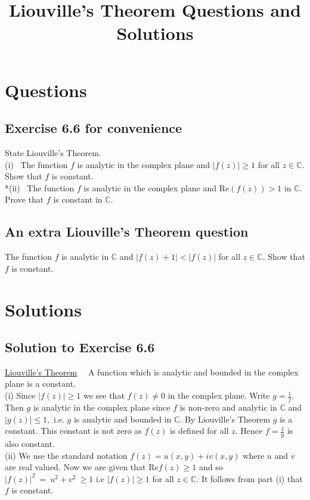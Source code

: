 \documentclass{amsart}
\title{Liouville's Theorem Questions and Solutions}
\begin{document}
\maketitle
\section*{Questions}
\subsection*{Exercise 6.6 for convenience}
 State Liouville's Theorem. \medskip \\
 \indent (i) ~The function $f$ is analytic in the complex plane and $|f(z)| \geq 1$ for all $z \in \mathbb{C}$. Show that $f$ is constant.  \\
 \indent **(ii) ~The function $f$ is analytic in the complex plane and  \textrm{Re}$(f(z)) >1 $ in $\mathbb{C}$. Prove that $f$ is constant in $\mathbb{C}$.

\subsection*{An extra Liouville's Theorem question}
 The function $f$ is analytic in $ \mathbb{C} $ and $ |f(z) +1| < |f(z)|$ for all $ z \in \mathbb{C}$. Show that $f$ is constant. 

\section*{Solutions}
\subsection*{Solution to Exercise 6.6}
\underline{Liouville's Theorem}~~ A function which is analytic and bounded in the complex plane is a constant. \medskip \\
\indent (i) Since $|f(z)| \geq 1$ we see that $f(z) \neq 0$ in the complex plane. Write $g =\frac{1}{f}$. Then $g$ is analytic in the complex plane
since $f$ is non-zero and analytic in $\mathbb{C}$ and $|g(z)| \leq 1,$ i.e. $g$ is analytic and bounded in $\mathbb{C}$. By Liouville's Theorem $g$ is a constant. This constant is not zero as $f(z)$ is defined for all $z$. Hence $f= \frac{1}{g}$ is also constant. \bigskip \\

\indent (ii) We use the standard notation $f(z) = u(x,y) + iv(x,y)$ where $u$ and $v$ are real valued. Now we are given that $\textrm{Re}{f(z)} \geq 1$ and so $|f(z)|^2 ~=~u^2 +v^2 ~\geq 1 $  i.e $|f(z)| \geq 1$ for all $z \in \mathbb{C}$. It follows from part (i) that $f$ is constant.
\end{document}
